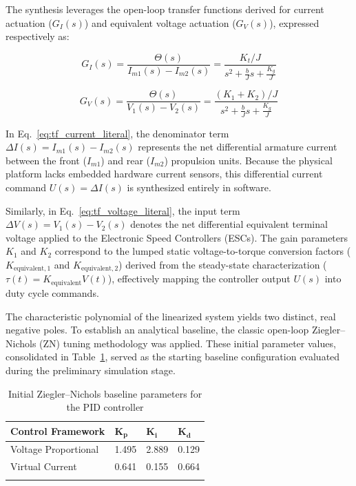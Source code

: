 \documentclass[pdflatex,sn-mathphys-num,iicol]{sn-jnl}
\theoremstyle{thmstyleone}%
\theoremstyle{thmstyletwo}%
\theoremstyle{thmstylethree}%
\begin{document}
The synthesis leverages the open-loop transfer functions derived for current actuation ($G_I(s)$) and equivalent voltage actuation ($G_V(s)$), expressed respectively as:

\begin{equation}
G_I(s) = \frac{\Theta(s)}{I_{m1}(s) - I_{m2}(s)} = \frac{K_t / J}{s^2 + \frac{b}{J}s + \frac{K_g}{J}}
\label{eq:tf_current_literal}
\end{equation}

\begin{equation}
G_V(s) = \frac{\Theta(s)}{V_1(s) - V_2(s)} = \frac{(K_1 + K_2) / J}{s^2 + \frac{b}{J}s + \frac{K_g}{J}}
\label{eq:tf_voltage_literal}
\end{equation}

In Eq.~\eqref{eq:tf_current_literal}, the denominator term $\Delta I(s) = I_{m1}(s) - I_{m2}(s)$ represents the net differential armature current between the front ($I_{m1}$) and rear ($I_{m2}$) propulsion units. Because the physical platform lacks embedded hardware current sensors, this differential current command $U(s) = \Delta I(s)$ is synthesized entirely in software.


Similarly, in Eq.~\eqref{eq:tf_voltage_literal}, the input term $\Delta V(s) = V_1(s) - V_2(s)$ denotes the net differential equivalent terminal voltage applied to the Electronic Speed Controllers (ESCs). The gain parameters $K_1$ and $K_2$ correspond to the lumped static voltage-to-torque conversion factors ($K_{\text{equivalent},1}$ and $K_{\text{equivalent},2}$) derived from the steady-state characterization ($\tau(t) = K_{\text{equivalent}}V(t)$), effectively mapping the controller output $U(s)$ into duty cycle commands.

The characteristic polynomial of the linearized system yields two distinct, real negative poles. To establish an analytical baseline, the classic open-loop Ziegler–Nichols (ZN) tuning methodology was applied. These initial parameter values, consolidated in Table~\ref{tab:pid_zn_base}, served as the starting baseline configuration evaluated during the preliminary simulation stage.

\begin{table}[h]
\caption{Initial Ziegler–Nichols baseline parameters for the PID controller}\label{tab:pid_zn_base}%
\begin{center}
\begin{minipage}{\columnwidth}
\footnotesize
\begin{tabular*}{\columnwidth}{@{\extracolsep{\fill}}@{}llll@{}}
\toprule
\textbf{Control Framework} & $\mathbf{K_p}$ & $\mathbf{K_i}$ & $\mathbf{K_d}$ \\
\midrule
Voltage Proportional & 1.495 & 2.889 & 0.129 \\
Virtual Current      & 0.641 & 0.155 & 0.664 \\
\botrule
\end{tabular*}
\end{minipage}
\end{center}
\end{table}
\end{document}
